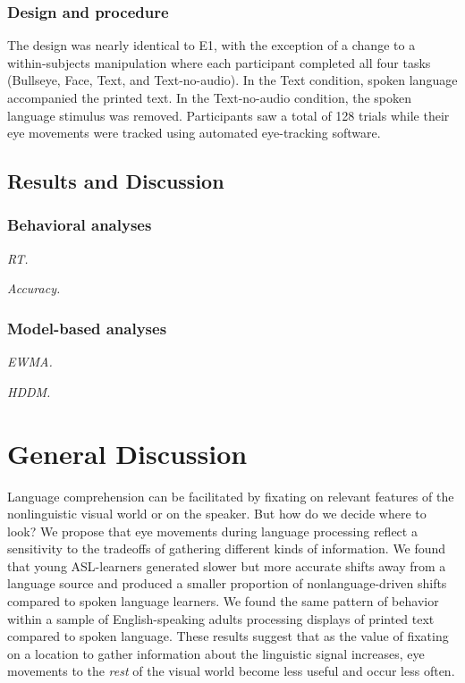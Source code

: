 \documentclass[10pt, letterpaper]{article}
\begin{document}
\subsubsection{Design and procedure}\label{design-and-procedure-1}

The design was nearly identical to E1, with the exception of a change to
a within-subjects manipulation where each participant completed all four
tasks (Bullseye, Face, Text, and Text-no-audio). In the Text condition,
spoken language accompanied the printed text. In the Text-no-audio
condition, the spoken language stimulus was removed. Participants saw a
total of 128 trials while their eye movements were tracked using
automated eye-tracking software.

\subsection{Results and Discussion}\label{results-and-discussion-1}

\subsubsection{Behavioral analyses}\label{behavioral-analyses-1}

\emph{RT.}

\emph{Accuracy.}

\subsubsection{Model-based analyses}\label{model-based-analyses-1}

\emph{EWMA.}

\emph{HDDM.}

\section{General Discussion}\label{general-discussion}

Language comprehension can be facilitated by fixating on relevant
features of the nonlinguistic visual world or on the speaker. But how do
we decide where to look? We propose that eye movements during language
processing reflect a sensitivity to the tradeoffs of gathering different
kinds of information. We found that young ASL-learners generated slower
but more accurate shifts away from a language source and produced a
smaller proportion of nonlanguage-driven shifts compared to spoken
language learners. We found the same pattern of behavior within a sample
of English-speaking adults processing displays of printed text compared
to spoken language. These results suggest that as the value of fixating
on a location to gather information about the linguistic signal
increases, eye movements to the \emph{rest} of the visual world become
less useful and occur less often.
\end{document}
